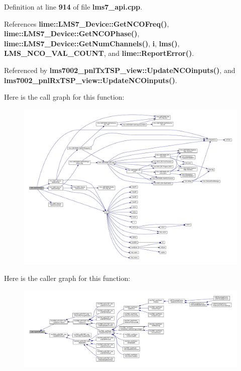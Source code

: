 Definition at line {\bf 914} of file {\bf lms7\+\_\+api.\+cpp}.



References {\bf lime\+::\+L\+M\+S7\+\_\+\+Device\+::\+Get\+N\+C\+O\+Freq()}, {\bf lime\+::\+L\+M\+S7\+\_\+\+Device\+::\+Get\+N\+C\+O\+Phase()}, {\bf lime\+::\+L\+M\+S7\+\_\+\+Device\+::\+Get\+Num\+Channels()}, {\bf i}, {\bf lms()}, {\bf L\+M\+S\+\_\+\+N\+C\+O\+\_\+\+V\+A\+L\+\_\+\+C\+O\+U\+NT}, and {\bf lime\+::\+Report\+Error()}.



Referenced by {\bf lms7002\+\_\+pnl\+Tx\+T\+S\+P\+\_\+view\+::\+Update\+N\+C\+Oinputs()}, and {\bf lms7002\+\_\+pnl\+Rx\+T\+S\+P\+\_\+view\+::\+Update\+N\+C\+Oinputs()}.



Here is the call graph for this function\+:
\nopagebreak
\begin{figure}[H]
\begin{center}
\leavevmode
\includegraphics[width=350pt]{df/de1/lms7__api_8cpp_a7c4442adb41c97eaf877ddf5fedfb26e_cgraph}
\end{center}
\end{figure}




Here is the caller graph for this function\+:
\nopagebreak
\begin{figure}[H]
\begin{center}
\leavevmode
\includegraphics[width=350pt]{df/de1/lms7__api_8cpp_a7c4442adb41c97eaf877ddf5fedfb26e_icgraph}
\end{center}
\end{figure}


